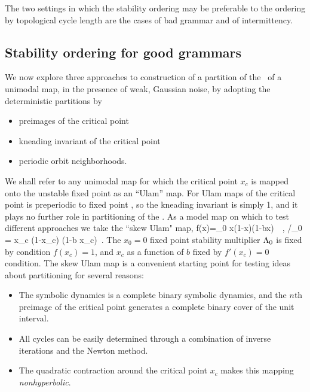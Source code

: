 The two settings in which the stability ordering may be preferable to
the ordering by topological cycle length are the cases of bad grammar
and of intermittency.


\subsection{Stability ordering for good grammars}

We now  explore three
approaches to construction of a partition of
the \statesp\ of a unimodal map,
in the presence of weak, Gaussian noise, by
adopting the deterministic partitions by
\begin{itemize}
    \item preimages of the critical point
    \item kneading invariant of the critical point
    \item periodic orbit neighborhoods.
\end{itemize}

%
%
We shall refer to any unimodal map for which
the critical point $x_c$ is
mapped onto the unstable fixed point  as an ``Ulam'' map.
For Ulam maps of the critical point is preperiodic to fixed
point , so the kneading invariant
is simply 1, and it plays no further role in partitioning
of the \statesp.
As a model map on which to test different approaches
we take the ``skew Ulam" map,
\beq
f(x)=\ExpaEig_0 x(1-x)(1-bx) \,\, , /\ExpaEig_0  = x_c (1-x_c) (1-b x_c) \,.
\label{exmp:skew_Ulam}
\eeq
The $x_0=0$ fixed point  stability multiplier $\Lambda_0$
is fixed by condition $f(x_c)=1$, and $x_c$ as a  function
of $b$ fixed by $f'(x_c)=0$ condition.
The skew Ulam map
is a convenient starting point for testing
ideas about partitioning for several reasons:
\begin{itemize}
\item
The symbolic dynamics is a complete binary symbolic dynamics,
and the $n$th preimage
of the critical point generates a complete binary cover
of the unit interval.

\item
All cycles can be easily determined through a combination of
inverse iterations %
and the Newton method. %

\item
The quadratic contraction around the critical point
$x_c$ makes this  mapping {\em nonhyperbolic}.

\end{itemize}


